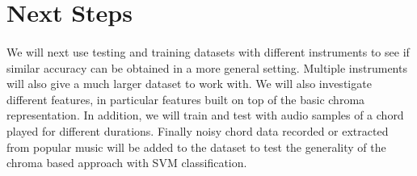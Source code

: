 \documentclass{article}
\begin{document}
\section{Next Steps}
\paragraph{}
We will next use testing and training datasets with different instruments to see if similar accuracy can be obtained in a more general setting. Multiple instruments will also give a much larger dataset to work with. We will also investigate different features, in particular features built on top of the basic chroma representation. In addition, we will train and test with audio samples of a chord played for different durations. Finally noisy chord data recorded or extracted from popular music will be added to the dataset to test the generality of the chroma based approach with SVM classification.

%
\end{document}
